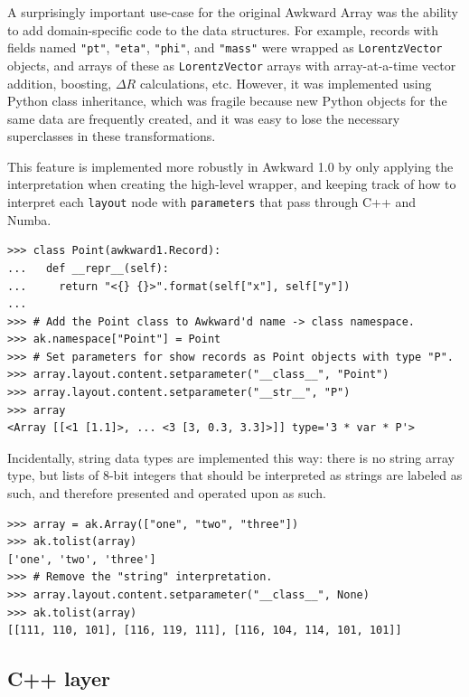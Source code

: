 \documentclass{webofc}
\begin{document}
A surprisingly important use-case for the original Awkward Array was the ability to add domain-specific code to the data structures. For example, records with fields named \texttt{"pt"}, \texttt{"eta"}, \texttt{"phi"}, and \texttt{"mass"} were wrapped as \texttt{LorentzVector} objects, and arrays of these as \texttt{LorentzVector} arrays with array-at-a-time vector addition, boosting, $\Delta R$ calculations, etc. However, it was implemented using Python class inheritance, which was fragile because new Python objects for the same data are frequently created, and it was easy to lose the necessary superclasses in these transformations.

This feature is implemented more robustly in Awkward 1.0 by only applying the interpretation when creating the high-level wrapper, and keeping track of how to interpret each \texttt{layout} node with \texttt{parameters} that pass through C++ and Numba.

\begin{verbatim}
>>> class Point(awkward1.Record):
...   def __repr__(self):
...     return "<{} {}>".format(self["x"], self["y"])
... 
>>> # Add the Point class to Awkward'd name -> class namespace.
>>> ak.namespace["Point"] = Point
>>> # Set parameters for show records as Point objects with type "P".
>>> array.layout.content.setparameter("__class__", "Point")
>>> array.layout.content.setparameter("__str__", "P")
>>> array
<Array [[<1 [1.1]>, ... <3 [3, 0.3, 3.3]>]] type='3 * var * P'>
\end{verbatim}

\noindent Incidentally, string data types are implemented this way: there is no string array type, but lists of 8-bit integers that should be interpreted as strings are labeled as such, and therefore presented and operated upon as such.

\begin{verbatim}
>>> array = ak.Array(["one", "two", "three"])
>>> ak.tolist(array)
['one', 'two', 'three']
>>> # Remove the "string" interpretation.
>>> array.layout.content.setparameter("__class__", None)
>>> ak.tolist(array)
[[111, 110, 101], [116, 119, 111], [116, 104, 114, 101, 101]]
\end{verbatim}

\subsection{C++ layer}
\end{document}
